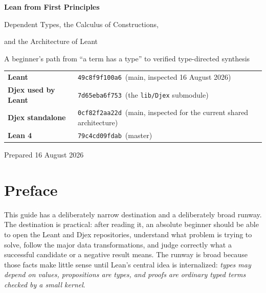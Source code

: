 \documentclass[10pt,letterpaper,oneside,openany]{report}
\newcommand{\term}[1]{\texttt{\detokenize{#1}}}
\newcommand{\LeantCommit}{\texttt{49c8f9f100a6}}
\newcommand{\DjexCommit}{\texttt{0cf82f2aa22d}}
\newcommand{\DjexPinnedCommit}{\texttt{7d65eba6f753}}
\newcommand{\LeanCommit}{\texttt{79c4cd09fdab}}
\begin{document}
\hypersetup{pageanchor=false}

\begin{titlepage}
\centering
\vspace*{0.7in}
{\sffamily\bfseries\color{SageDark}\fontsize{34}{40}\selectfont
Lean from First Principles\par}
\vspace{0.35in}
{\sffamily\color{Blue}\fontsize{19}{24}\selectfont
Dependent Types, the Calculus of Constructions,\par
and the Architecture of Leant\par}
\vspace{0.55in}
{\large A beginner's path from ``a term has a type'' to verified type-directed synthesis}
\vfill
\begin{tcolorbox}[width=0.84\textwidth,colback=Paper,colframe=Sage,colbacktitle=SageDark,
  title=Repository snapshot]
\small
\begin{tabularx}{\linewidth}{@{}>{\bfseries}l X@{}}
Leant & \LeantCommit\ (main, inspected 16 August 2026)\\
Djex used by Leant & \DjexPinnedCommit\ (the \texttt{lib/Djex} submodule)\\
Djex standalone & \DjexCommit\ (main, inspected for the current shared architecture)\\
Lean 4 & \LeanCommit\ (master)\\
\end{tabularx}
\end{tcolorbox}
\vfill
{\sffamily\color{MutedInk}Prepared 16 August 2026}
\end{titlepage}


\chapter*{Preface}

This guide has a deliberately narrow destination and a deliberately broad runway.  The destination is practical: after reading it, an absolute beginner should be able to open the Leant and Djex repositories, understand what problem \term{:synth} is trying to solve, follow the major data transformations, and judge correctly what a successful candidate or a negative result means.  The runway is broad because those facts make little sense until Lean's central idea is internalized: \emph{types may depend on values, propositions are types, and proofs are ordinary typed terms checked by a small kernel}.
\end{document}

